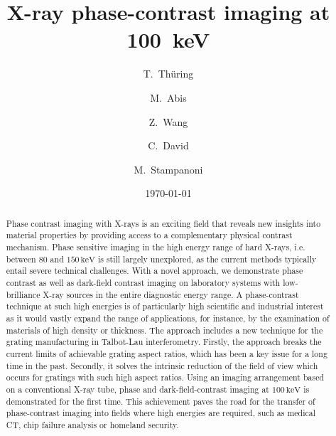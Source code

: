 \documentclass[aip,apl,amsmath,amssymb,floatfix,reprint,a4paper]{revtex4-1}
\newcommand{\unit}[1]{\ensuremath{\, \mathrm{#1}}}
\begin{document}
\title{X-ray phase-contrast imaging at 100~keV}

\author{T.~Thüring}
\author{M.~Abis}
\author{Z.~Wang}
\author{C.~David}
\author{M.~Stampanoni}

\date{\today}


\begin{abstract}
Phase contrast imaging with X-rays is an exciting field that reveals new insights into material properties by providing access to a complementary physical contrast mechanism. Phase sensitive imaging in the high energy range of hard X-rays, i.e. between $80$ and $150 \unit{keV}$ is still largely unexplored, as the current methods typically entail severe technical challenges. With a novel approach, we demonstrate phase contrast as well as dark-field contrast imaging on laboratory systems with low-brilliance X-ray sources in the entire diagnostic energy range. A phase-contrast technique at such high energies is of particularly high scientific and industrial interest as it would vastly expand the range of applications, for instance, by the examination of materials of high density or thickness. The approach includes a new technique for the grating manufacturing in Talbot-Lau interferometry. Firstly, the approach breaks the current limits of achievable grating aspect ratios, which has been a key issue for a long time in the past. Secondly, it solves the intrinsic reduction of the field of view which occurs for gratings with such high aspect ratios. Using an imaging arrangement based on a conventional X-ray tube, phase and dark-field-contrast imaging at $100 \unit{keV}$ is demonstrated for the first time. This achievement paves the road for the transfer of phase-contrast imaging into fields where high energies are required, such as medical CT, chip failure analysis or homeland security.
\end{abstract}
\end{document}
